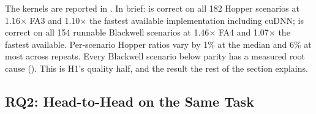 The kernels are reported in . In brief: \ksFaThree is correct on all 182 Hopper
scenarios at 1.16$\times$ FA3 and 1.10$\times$ the fastest available implementation including cuDNN;
\ksFaFour is correct on all 154 runnable Blackwell scenarios at 1.46$\times$ FA4 and 1.07$\times$ the
fastest available. Per-scenario Hopper ratios vary by 1\% at the median and 6\% at most across
repeats. Every Blackwell scenario below parity has a measured root cause ().
This is H1's quality half, and the result the rest of the section explains.

\subsection{RQ2: Head-to-Head on the Same Task}
\label{kernelseek:sec:eval-h2h}

